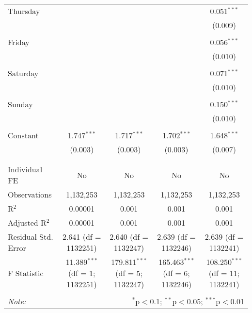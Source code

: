 \documentclass[
]{article}
\begin{document}
\begin{table}[!htbp]
{\begin{tabular}{@{\extracolsep{5pt}}lcccc}
 Thursday &  &  &  & 0.051$^{***}$ \\ 
  &  &  &  & (0.009) \\ 
  & & & & \\ 
 Friday &  &  &  & 0.056$^{***}$ \\ 
  &  &  &  & (0.010) \\ 
  & & & & \\ 
 Saturday &  &  &  & 0.071$^{***}$ \\ 
  &  &  &  & (0.010) \\ 
  & & & & \\ 
 Sunday &  &  &  & 0.150$^{***}$ \\ 
  &  &  &  & (0.010) \\ 
  & & & & \\ 
 Constant & 1.747$^{***}$ & 1.717$^{***}$ & 1.702$^{***}$ & 1.648$^{***}$ \\ 
  & (0.003) & (0.003) & (0.003) & (0.007) \\ 
  & & & & \\ 
\hline \\[-1.8ex] 
Individual FE & No & No & No & No \\ 
Observations & 1,132,253 & 1,132,253 & 1,132,253 & 1,132,253 \\ 
R$^{2}$ & 0.00001 & 0.001 & 0.001 & 0.001 \\ 
Adjusted R$^{2}$ & 0.00001 & 0.001 & 0.001 & 0.001 \\ 
Residual Std. Error & 2.641 (df = 1132251) & 2.640 (df = 1132247) & 2.639 (df = 1132246) & 2.639 (df = 1132241) \\ 
F Statistic & 11.389$^{***}$ (df = 1; 1132251) & 179.811$^{***}$ (df = 5; 1132247) & 165.463$^{***}$ (df = 6; 1132246) & 108.250$^{***}$ (df = 11; 1132241) \\ 
\hline 
\hline \\[-1.8ex] 
\textit{Note:}  & \multicolumn{4}{r}{$^{*}$p$<$0.1; $^{**}$p$<$0.05; $^{***}$p$<$0.01} \\ 
\end{tabular}
} 
\end{table} 
\newpage
\end{document}
